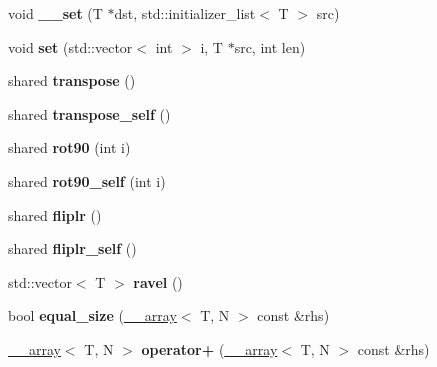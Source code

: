 \begin{DoxyCompactItemize}
\item 
\hypertarget{class____array_af9523af4f7911a07f54d8fce750e3332}{
void {\bfseries \_\-\_\-set} (T $\ast$dst, std::initializer\_\-list$<$ T $>$ src)}
\label{class____array_af9523af4f7911a07f54d8fce750e3332}

\item 
\hypertarget{class____array_a272fe82c6f31832970e123ac4ca66b08}{
void {\bfseries set} (std::vector$<$ int $>$ i, T $\ast$src, int len)}
\label{class____array_a272fe82c6f31832970e123ac4ca66b08}

\item 
\hypertarget{class____array_a5e014a0a3f33a9d1a11823971ed90b1a}{
shared {\bfseries transpose} ()}
\label{class____array_a5e014a0a3f33a9d1a11823971ed90b1a}

\item 
\hypertarget{class____array_ac1c5c3051c03e39b9715903ee0fb202d}{
shared {\bfseries transpose\_\-self} ()}
\label{class____array_ac1c5c3051c03e39b9715903ee0fb202d}

\item 
\hypertarget{class____array_a7f4e2417c5e5c8beec1ac35d0a145ac9}{
shared {\bfseries rot90} (int i)}
\label{class____array_a7f4e2417c5e5c8beec1ac35d0a145ac9}

\item 
\hypertarget{class____array_a0f127aa40d72c1087c538619e5cd6ef9}{
shared {\bfseries rot90\_\-self} (int i)}
\label{class____array_a0f127aa40d72c1087c538619e5cd6ef9}

\item 
\hypertarget{class____array_a66e5055d7c2958ffd23a9392604af8f8}{
shared {\bfseries fliplr} ()}
\label{class____array_a66e5055d7c2958ffd23a9392604af8f8}

\item 
\hypertarget{class____array_a9de6105d23a33b20a4b0cc02b923edb4}{
shared {\bfseries fliplr\_\-self} ()}
\label{class____array_a9de6105d23a33b20a4b0cc02b923edb4}

\item 
\hypertarget{class____array_a07f72930f0260b81df31b991f4c7e97d}{
std::vector$<$ T $>$ {\bfseries ravel} ()}
\label{class____array_a07f72930f0260b81df31b991f4c7e97d}

\item 
\hypertarget{class____array_accc02e65ce775d472554778825ebdeda}{
bool {\bfseries equal\_\-size} (\hyperlink{class____array}{\_\-\_\-array}$<$ T, N $>$ const \&rhs)}
\label{class____array_accc02e65ce775d472554778825ebdeda}

\item 
\hypertarget{class____array_a435566ff4cab00684e41335595b4c60c}{
\hyperlink{class____array}{\_\-\_\-array}$<$ T, N $>$ {\bfseries operator+} (\hyperlink{class____array}{\_\-\_\-array}$<$ T, N $>$ const \&rhs)}
\label{class____array_a435566ff4cab00684e41335595b4c60c}

\end{DoxyCompactItemize}
